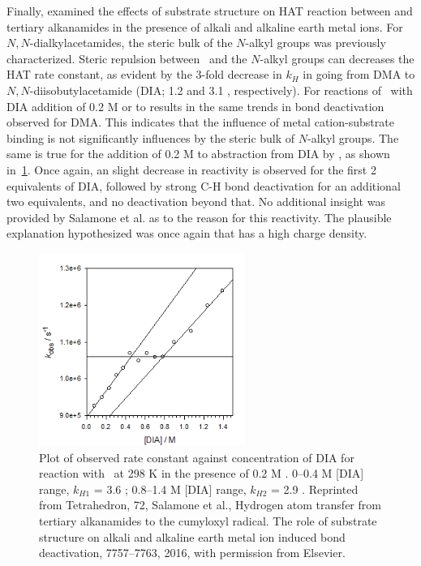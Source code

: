 Finally, \citet{Salamone2016} examined the effects of substrate structure on HAT reaction between \cumo and tertiary alkanamides in the presence of alkali and alkaline earth metal ions. For $N,N$-dialkylacetamides, the steric bulk of the $N$-alkyl groups was previously characterized.\cite{Salamone2014} Steric repulsion between \cumo\ and the $N$-alkyl groups can decreases the HAT rate constant, as evident by the 3-fold decrease in $k_H$ in going from DMA to $N,N$-diisobutylacetamide (DIA; 1.2 and 3.1 \Ms, respectively). For reactions of \cumo\ with DIA addition of 0.2 M  or  to results in the same trends in  bond deactivation observed for DMA. This indicates that the influence of metal cation-substrate binding is not significantly influences by the steric bulk of $N$-alkyl groups.  The same is true for the addition of 0.2 M  to abstraction from DIA by \cumo, as shown in~\ref{fig:k-dia-mg}. Once again, an slight decrease in reactivity is observed for the first 2 equivalents of DIA, followed by strong C-H bond deactivation for an additional two equivalents, and no deactivation beyond that. No additional insight was provided by Salamone et al. as to the reason for this reactivity. The plausible explanation hypothesized was once again that  has a high charge density.

\begin{figure}[!htbp]
  \includegraphics[width=0.6\textwidth]{figures/exptdia-mg.png}
  \caption[Plot of observed rate constant against concentration of DIA for reaction with \cumo\ at 298 K in the presence of 0.2 M .]
  {Plot of observed rate constant against concentration of DIA for reaction with \cumo\ at 298 K in the presence of 0.2 M . 0--0.4 M [DIA] range, $k_{H1}$ = 3.6 \Ms; 0.8--1.4 M [DIA] range, $k_{H2}$ = 2.9 \Ms.
  Reprinted from Tetrahedron, 72, Salamone et al., Hydrogen atom transfer from tertiary alkanamides to the cumyloxyl radical. The role of substrate structure on alkali and alkaline earth metal ion induced  bond deactivation, 7757--7763, 2016, with permission from Elsevier.}
  \label{fig:k-dia-mg}
\end{figure}


